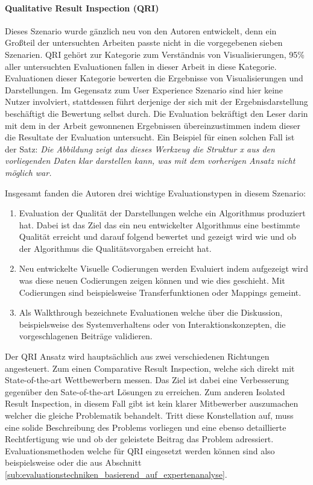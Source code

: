 \documentclass[draft=false
              ,paper=a4
              ,twoside=false
              ,fontsize=11pt
              ,headsepline
              ,BCOR10mm
              ,DIV11
              ]{scrbook}
\begin{document}
\paragraph{Qualitative Result Inspection (QRI)} %
\label{par:qualitative_result_inspection_}
Dieses Szenario wurde gänzlich neu von den Autoren entwickelt, denn ein Großteil der untersuchten Arbeiten passte nicht in die vorgegebenen sieben Szenarien. QRI gehört zur Kategorie zum Verständnis von Visualisierungen, 95\% aller untersuchten Evaluationen fallen in dieser Arbeit in diese Kategorie. Evaluationen dieser Kategorie bewerten die Ergebnisse von Visualisierungen und Darstellungen. Im Gegensatz zum User Experience Szenario sind hier keine Nutzer involviert, stattdessen führt derjenige der sich mit der Ergebnisdarstellung beschäftigt die Bewertung selbst durch. Die Evaluation bekräftigt den Leser darin mit dem in der Arbeit gewonnenen Ergebnissen übereinzustimmen indem dieser die Resultate der Evaluation untersucht. Ein Beispiel für einen solchen Fall ist der Satz: \textit{\glqq Die Abbildung zeigt das dieses Werkzeug die Struktur x aus den vorliegenden Daten klar darstellen kann, was mit dem vorherigen Ansatz nicht möglich war.\grqq} 

Insgesamt fanden die Autoren drei wichtige Evaluationstypen in diesem Szenario:

\begin{enumerate}
  \item Evaluation der Qualität der Darstellungen welche ein Algorithmus produziert hat. Dabei ist das Ziel das ein neu entwickelter Algorithmus eine bestimmte Qualität erreicht und darauf folgend bewertet und gezeigt wird wie und ob der Algorithmus die Qualitätsvorgaben erreicht hat.  
  \item Neu entwickelte Visuelle Codierungen werden Evaluiert indem aufgezeigt wird was diese neuen Codierungen zeigen können und wie dies geschieht. Mit Codierungen sind beispielsweise Transferfunktionen oder Mappings gemeint.
  \item Als Walkthrough bezeichnete Evaluationen welche über die Diskussion, beispielsweise des Systemverhaltens oder von Interaktionskonzepten, die vorgeschlagenen Beiträge validieren.
\end{enumerate}

Der QRI Ansatz wird hauptsächlich aus zwei verschiedenen Richtungen angesteuert. Zum einen Comparative Result Inspection, welche sich direkt mit State-of-the-art Wettbewerbern messen. Das Ziel ist dabei eine Verbesserung gegenüber den Sate-of-the-art Lösungen zu erreichen. Zum anderen Isolated Result Inspection, in diesem Fall gibt ist kein klarer Mitbewerber auszumachen welcher die gleiche Problematik behandelt. Tritt diese Konstellation auf, muss eine solide Beschreibung des Problems vorliegen und eine ebenso detaillierte Rechtfertigung wie und ob der geleistete Beitrag das Problem adressiert. Evaluationsmethoden welche für QRI eingesetzt werden können sind also beispielsweise  oder die  aus Abschnitt \ref{sub:evaluationstechniken_basierend_auf_expertenanalyse}.
\end{document}
